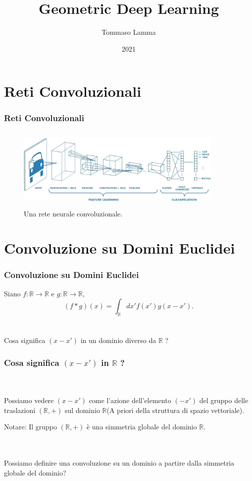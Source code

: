 \documentclass[xcolor=dvipsnames]{beamer}
\title{Geometric Deep Learning}
\author{Tommaso Lamma}
\date{2021}
\newcommand{\R}{\mathbb{R}}
\begin{document}
\frame{\titlepage}

\frame{\tableofcontents}

\section{Reti Convoluzionali}

\begin{frame}
    \frametitle{Reti Convoluzionali}
    \begin{figure}[H]
        \centering
        \includegraphics[width=10cm, height=4cm]{cnn}
        \caption{Una rete neurale convoluzionale.}
    \end{figure}       
\end{frame}

\section{Convoluzione su Domini Euclidei}

\begin{frame}
    \frametitle{Convoluzione su Domini Euclidei}    
    Siano $f:\R \to \R$ e $g:\R \to \R$,
    \[ (f * g)(x) = \int_{\R} dx' f(x')g(x-x'). \]
    \hfill \\
    \hfill \\
    { \large Cosa significa $(x - x')$ in un dominio diverso da $\R$ ?}
\end{frame}

\begin{frame}
    \frametitle{ \large Cosa significa $(x - x')$ \textbf{in} $\R$ ?}
    \hfill \\
    \hfill \\
    Possiamo vedere $( x - x')$ come l'azione dell'elemento $(-x')$ del gruppo delle traslazioni $(\R, +)$
    sul dominio $\R$(A priori della struttura di spazio vettoriale).
    \begin{block}{Notare:}
        Il gruppo $(\R, +)$ è una simmetria globale del dominio $\R$.  
    \end{block}
    \hfill \\
    \hfill \\
    {\large Possiamo definire una convoluzione su un dominio a partire dalla simmetria globale del dominio?}
\end{frame}
\end{document}
